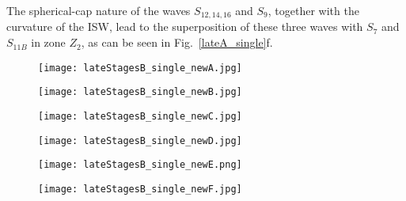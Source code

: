 \documentclass[3p,times,twocolumn]{elsarticle}
\begin{document}
The spherical-cap nature of the waves $S_{12,14,16}$ and $S_9$,
together with the curvature of the ISW, lead to the superposition of these
three waves with $S_7$ and $S_{11B}$ in zone $Z_2$, as can be seen in Fig.\
 \ref{lateA_single}f. 
\begin{figure*}[!t]
\begin{minipage}{2\columnwidth}
\centering
        \begin{subfigure}[b]{0.329\textwidth}
\texttt{[image: lateStagesB\_single\_newA.jpg]}
        \end{subfigure}
        \begin{subfigure}[b]{0.329\textwidth}
\texttt{[image: lateStagesB\_single\_newB.jpg]}
        \end{subfigure}
\begin{subfigure}[b]{0.329\textwidth}
\texttt{[image: lateStagesB\_single\_newC.jpg]}
        \end{subfigure}
\end{minipage}
\begin{minipage}{2\columnwidth}
\centering
\begin{subfigure}[b]{0.329\textwidth}
\texttt{[image: lateStagesB\_single\_newD.jpg]}
        \end{subfigure}
        \begin{subfigure}[b]{0.329\textwidth}
\texttt{[image: lateStagesB\_single\_newE.png]}
        \end{subfigure}
\begin{subfigure}[b]{0.329\textwidth}
\texttt{[image: lateStagesB\_single\_newF.jpg]}
        \end{subfigure}
\end{minipage}
\caption{Mock-schlieren plots of the late stages (ctd.\ from Fig.\ \ref{lateB_single}) in the collapse process
of a single cavity,  on the central $xz$-plane of the three-dimensional field,
at selected times after the collapse.   Shocks are denoted as `S' and
zones as `Z'. The horizontal axis represents $x$  and the vertical axis $z$,
both  in \SI{}{\micro \meter}. }
\label{lateB_single}
\end{figure*}
\end{document}
